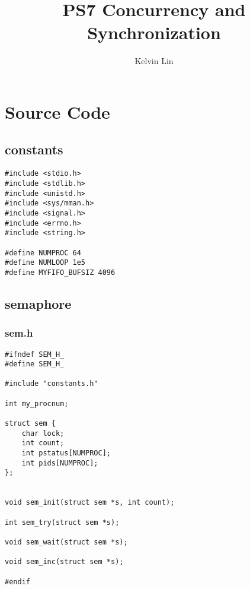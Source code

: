 \documentclass[12pt]{article}
\title{PS7 Concurrency and Synchronization}
\author{Kelvin Lin}
\begin{document}
\maketitle

\section{Source Code}

\subsection{constants}

\begin{lstlisting}
#include <stdio.h>
#include <stdlib.h>
#include <unistd.h>
#include <sys/mman.h>
#include <signal.h>
#include <errno.h>
#include <string.h>

#define NUMPROC 64
#define NUMLOOP 1e5
#define MYFIFO_BUFSIZ 4096
\end{lstlisting}

\subsection{semaphore}

    \subsubsection{sem.h}
    \begin{lstlisting}
#ifndef SEM_H_
#define SEM_H_

#include "constants.h"

int my_procnum;

struct sem {
    char lock;
    int count;
    int pstatus[NUMPROC];
    int pids[NUMPROC];
};


void sem_init(struct sem *s, int count);

int sem_try(struct sem *s);

void sem_wait(struct sem *s);

void sem_inc(struct sem *s);

#endif
    \end{lstlisting}
\end{document}
